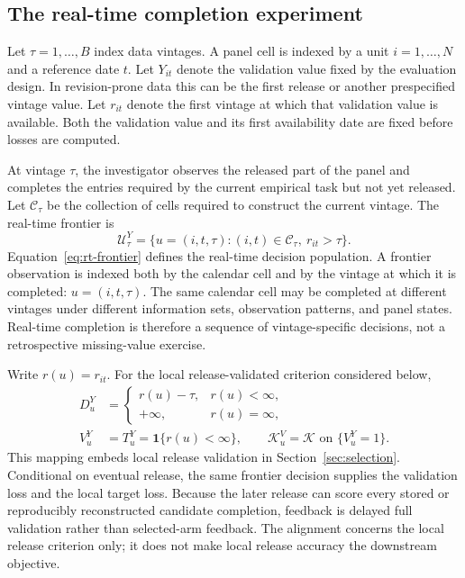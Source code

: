 \documentclass[a4paper, 12pt]{article}
\theoremstyle{plain}
\theoremstyle{remark}
\newcommand{\Kcal}{\mathcal{K}}
\newcommand{\Ucal}{\mathcal{U}}
\newcommand{\1}{\mathbf{1}}
\begin{document}
\subsection{The real-time completion experiment}

Let \(\tau=1,\ldots,B\) index data vintages. A panel cell is indexed by a unit \(i=1,\ldots,N\) and a reference date \(t\). Let \(Y_{it}\) denote the validation value fixed by the evaluation design. In revision-prone data this can be the first release or another prespecified vintage value. Let \(r_{it}\) denote the first vintage at which that validation value is available. Both the validation value and its first availability date are fixed before losses are computed.

At vintage \(\tau\), the investigator observes the released part of the panel and completes the entries required by the current empirical task but not yet released. Let \(\mathcal C_\tau\) be the collection of cells required to construct the current vintage. The real-time frontier is
\begin{equation}
\label{eq:rt-frontier}
    \Ucal^Y_\tau
    =
    \{u=(i,t,\tau):(i,t)\in\mathcal C_\tau,\ r_{it}>\tau\} .
\end{equation}
Equation~\eqref{eq:rt-frontier} defines the real-time decision population. A frontier observation is indexed both by the calendar cell and by the vintage at which it is completed: \(u=(i,t,\tau)\). The same calendar cell may be completed at different vintages under different information sets, observation patterns, and panel states. Real-time completion is therefore a sequence of vintage-specific decisions, not a retrospective missing-value exercise.

Write \(r(u)=r_{it}\). For the local release-validated criterion considered below,
\begin{equation}
\label{eq:rt-section3-map}
\begin{aligned}
    D^Y_u&=
    \begin{cases}
        r(u)-\tau, & r(u)<\infty,\\
        +\infty, & r(u)=\infty,
    \end{cases}
    \\
    V^Y_u&=T^Y_u=\1\{r(u)<\infty\},
    \qquad
    \Kcal^V_u=\Kcal \text{ on } \{V^Y_u=1\} .
\end{aligned}
\end{equation}
This mapping embeds local release validation in Section~\ref{sec:selection}. Conditional on eventual release, the same frontier decision supplies the validation loss and the local target loss. Because the later release can score every stored or reproducibly reconstructed candidate completion, feedback is delayed full validation rather than selected-arm feedback. The alignment concerns the local release criterion only; it does not make local release accuracy the downstream objective.
\end{document}
